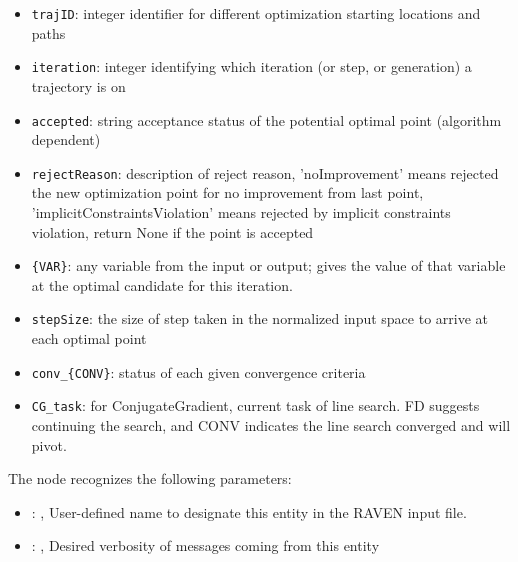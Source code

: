         \begin{itemize}
          \item \texttt{trajID}: integer identifier for different optimization starting locations and paths
             \item \texttt{iteration}: integer identifying which iteration (or step, or generation) a trajectory is on
             \item \texttt{accepted}: string acceptance status of the potential optimal point (algorithm dependent)
             \item \texttt{rejectReason}: description of reject reason, 'noImprovement' means rejected the new optimization point for no improvement from last point, 'implicitConstraintsViolation' means rejected by implicit constraints violation, return None if the point is accepted
             \item \texttt{\{VAR\}}: any variable from the  input or output; gives the value of that variable at the optimal candidate for this iteration.
             \item \texttt{stepSize}: the size of step taken in the normalized input space to arrive at each optimal point
             \item \texttt{conv\_\{CONV\}}: status of each given convergence criteria
             \item \texttt{CG\_task}: for ConjugateGradient, current task of line search. FD suggests continuing the search, and CONV indicates the line search converged and will pivot.
           
         \end{itemize}

  The  node recognizes the following parameters:
    \begin{itemize}
      \item {}: , 
        User-defined name to designate this entity in the RAVEN input file.
      \item {}: , 
        Desired verbosity of messages coming from this entity
  \end{itemize}

